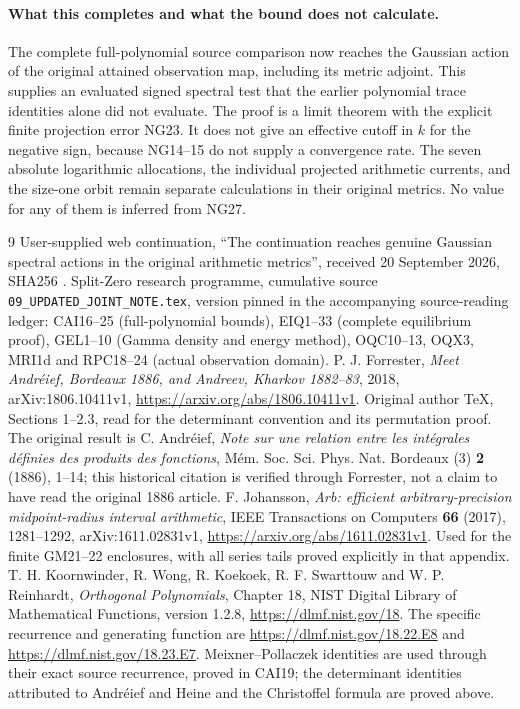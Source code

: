 \documentclass[11pt]{article}
\begin{document}
\paragraph{What this completes and what the bound does not calculate.}
The complete full-polynomial source comparison now reaches the Gaussian
action of the original attained observation map, including its metric
adjoint. This supplies an evaluated signed spectral test that the earlier
polynomial trace identities alone did not evaluate. The proof is a limit
theorem with the explicit finite projection error NG23. It does not give
an effective cutoff in $k$ for the negative sign, because NG14--15 do not
supply a convergence rate. The seven absolute logarithmic allocations,
the individual projected arithmetic currents, and the size-one orbit
remain separate calculations in their original metrics. No value for
any of them is inferred from NG27.

\begin{thebibliography}{9}
 User-supplied web continuation, ``The continuation reaches
genuine Gaussian spectral actions in the original arithmetic metrics'',
received 20 September 2026, SHA256
.
 Split-Zero research programme, cumulative source
\texttt{09\_UPDATED\_JOINT\_NOTE.tex}, version pinned in the accompanying
source-reading ledger: CAI16--25 (full-polynomial bounds), EIQ1--33
(complete equilibrium proof), GEL1--10 (Gamma density and energy method),
OQC10--13, OQX3, MRI1d and RPC18--24 (actual observation domain).
 P. J. Forrester, \emph{Meet Andr\'eief, Bordeaux 1886,
and Andreev, Kharkov 1882--83}, 2018, arXiv:1806.10411v1,
\url{https://arxiv.org/abs/1806.10411v1}. Original author TeX, Sections
1--2.3, read for the determinant convention and its permutation proof.
The original result is C. Andr\'eief, \emph{Note sur une relation entre
les int\'egrales d\'efinies des produits des fonctions},
M\'em. Soc. Sci. Phys. Nat. Bordeaux (3) \textbf{2} (1886), 1--14;
this historical citation is verified through Forrester, not a claim
to have read the original 1886 article.
 F. Johansson, \emph{Arb: efficient arbitrary-precision
midpoint-radius interval arithmetic}, IEEE Transactions on Computers
\textbf{66} (2017), 1281--1292, arXiv:1611.02831v1,
\url{https://arxiv.org/abs/1611.02831v1}. Used for the finite GM21--22
enclosures, with all series tails proved explicitly in that appendix.
 T. H. Koornwinder, R. Wong, R. Koekoek,
R. F. Swarttouw and W. P. Reinhardt, \emph{Orthogonal Polynomials},
Chapter 18, NIST Digital Library of Mathematical Functions, version 1.2.8,
\url{https://dlmf.nist.gov/18}. The specific recurrence and generating
function are \url{https://dlmf.nist.gov/18.22.E8} and
\url{https://dlmf.nist.gov/18.23.E7}.
Meixner--Pollaczek identities are used through their exact source
recurrence, proved in CAI19; the determinant identities attributed to
Andr\'eief and Heine and the Christoffel formula are proved above.
\end{thebibliography}
\end{document}
